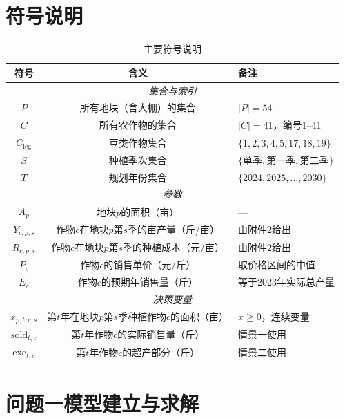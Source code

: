 \documentclass[12pt,a4paper]{ctexart}
\begin{document}
\section{符号说明}

\begin{table}[H]
\centering
\caption{主要符号说明}
\label{tab:symbols}
\begin{tabular}{ccl}
\toprule
\textbf{符号} & \textbf{含义} & \textbf{备注} \\
\midrule
\multicolumn{3}{c}{\textit{集合与索引}} \\
$P$ & 所有地块（含大棚）的集合 & $|P| = 54$ \\
$C$ & 所有农作物的集合 & $|C| = 41$，编号1--41 \\
$C_{\text{leg}}$ & 豆类作物集合 & $\{1,2,3,4,5,17,18,19\}$ \\
$S$ & 种植季次集合 & $\{\text{单季}, \text{第一季}, \text{第二季}\}$ \\
$T$ & 规划年份集合 & $\{2024, 2025, \dots, 2030\}$ \\
\midrule
\multicolumn{3}{c}{\textit{参数}} \\
$A_p$ & 地块$p$的面积（亩） & --- \\
$Y_{c,p,s}$ & 作物$c$在地块$p$第$s$季的亩产量（斤/亩） & 由附件2给出 \\
$R_{c,p,s}$ & 作物$c$在地块$p$第$s$季的种植成本（元/亩） & 由附件2给出 \\
$P_c$ & 作物$c$的销售单价（元/斤） & 取价格区间的中值 \\
$E_c$ & 作物$c$的预期年销售量（斤） & 等于2023年实际总产量 \\
\midrule
\multicolumn{3}{c}{\textit{决策变量}} \\
$x_{p,t,c,s}$ & 第$t$年在地块$p$第$s$季种植作物$c$的面积（亩） & $x \geq 0$，连续变量 \\
$\text{sold}_{t,c}$ & 第$t$年作物$c$的实际销售量（斤） & 情景一使用 \\
$\text{exc}_{t,c}$ & 第$t$年作物$c$的超产部分（斤） & 情景二使用 \\
\bottomrule
\end{tabular}
\end{table}

\section{问题一模型建立与求解}
\end{document}
